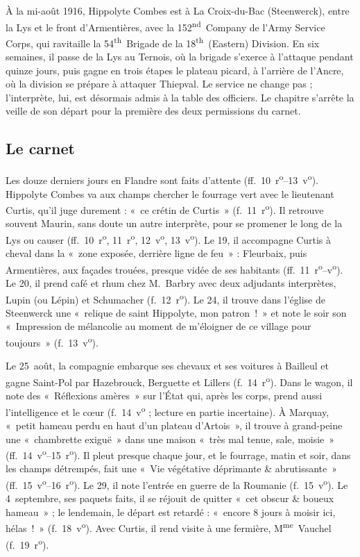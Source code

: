 
À la mi-août 1916, Hippolyte Combes est à La Croix-du-Bac (Steenwerck), entre la Lys et le front d'Armentières, avec la 152\textsuperscript{nd}~Company de l'Army Service Corps, qui ravitaille la 54\textsuperscript{th}~Brigade de la 18\textsuperscript{th}~(Eastern) Division. En six semaines, il passe de la Lys au Ternois, où la brigade s'exerce à l'attaque pendant quinze jours, puis gagne en trois étapes le plateau picard, à l'arrière de l'Ancre, où la division se prépare à attaquer Thiepval. Le service ne change pas ; l'interprète, lui, est désormais admis à la table des officiers. Le chapitre s'arrête la veille de son départ pour la première des deux permissions du carnet.

\subsection*{Le carnet}

Les douze derniers jours en Flandre sont faits d'attente (ff.~10~r\textsuperscript{o}--13~v\textsuperscript{o}). Hippolyte Combes va aux champs chercher le fourrage vert avec le lieutenant Curtis, qu'il juge durement : «~ce crétin de Curtis~» (f.~11~r\textsuperscript{o}). Il retrouve souvent Maurin, sans doute un autre interprète, pour se promener le long de la Lys ou causer (ff.~10~r\textsuperscript{o}, 11~r\textsuperscript{o}, 12~v\textsuperscript{o}, 13~v\textsuperscript{o}). Le 19, il accompagne Curtis à cheval dans la «~zone exposée, derrière ligne de feu~» : Fleurbaix, puis Armentières, aux façades trouées, presque vidée de ses habitants (ff.~11~r\textsuperscript{o}--v\textsuperscript{o}). Le 20, il prend café et rhum chez M.~Barbry avec deux adjudants interprètes, Lupin (ou Lépin) et Schumacher (f.~12~r\textsuperscript{o}). Le 24, il trouve dans l'église de Steenwerck une «~relique de saint Hippolyte, mon patron~!~» et note le soir son «~Impression de mélancolie au moment de m'éloigner de ce village pour toujours~» (f.~13~v\textsuperscript{o}).

Le 25~août, la compagnie embarque ses chevaux et ses voitures à Bailleul et gagne Saint-Pol par Hazebrouck, Berguette et Lillers (f.~14~r\textsuperscript{o}). Dans le wagon, il note des «~Réflexions amères~» sur l'État qui, après les corps, prend aussi l'intelligence et le cœur (f.~14~v\textsuperscript{o} ; lecture en partie incertaine). À Marquay, «~petit hameau perdu en haut d'un plateau d'Artois~», il trouve à grand-peine une «~chambrette exiguë~» dans une maison «~très mal tenue, sale, moisie~» (ff.~14~v\textsuperscript{o}--15~r\textsuperscript{o}). Il pleut presque chaque jour, et le fourrage, matin et soir, dans les champs détrempés, fait une «~Vie végétative déprimante \& abrutissante~» (ff.~15~v\textsuperscript{o}--16~r\textsuperscript{o}). Le 29, il note l'entrée en guerre de la Roumanie (f.~15~v\textsuperscript{o}). Le 4~septembre, ses paquets faits, il se réjouit de quitter «~cet obscur \& boueux hameau~» ; le lendemain, le départ est retardé : «~encore 8 jours à moisir ici, hélas~!~» (f.~18~v\textsuperscript{o}). Avec Curtis, il rend visite à une fermière, M\textsuperscript{me}~Vauchel (f.~19~r\textsuperscript{o}).

